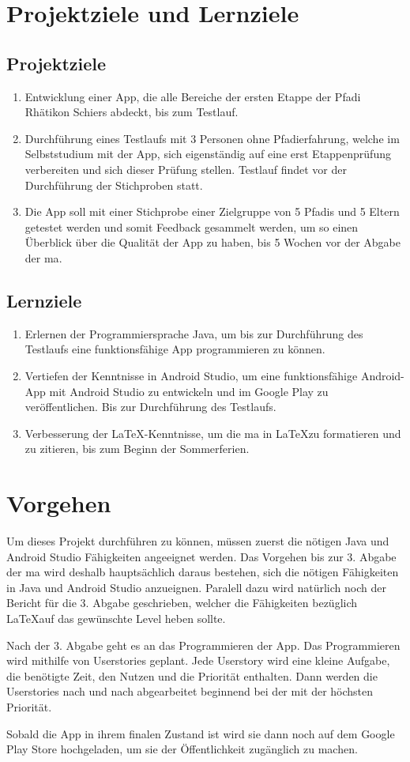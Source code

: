 \section{Projektziele und Lernziele}
\subsection*{Projektziele}
\begin{enumerate}
    \item Entwicklung einer App, die alle Bereiche der ersten Etappe der Pfadi Rhätikon Schiers abdeckt, bis zum Testlauf.
    \item Durchführung eines Testlaufs mit 3 Personen ohne Pfadierfahrung, welche im Selbststudium mit der App, sich eigenständig auf eine erst Etappenprüfung verbereiten und sich dieser Prüfung stellen. Testlauf findet vor der Durchführung der Stichproben statt.
    \item Die App soll mit einer Stichprobe einer Zielgruppe von 5 Pfadis und 5 Eltern getestet werden und somit Feedback gesammelt werden, um so einen Überblick über die Qualität der App zu haben, bis 5 Wochen vor der Abgabe der \gls{ma}.
\end{enumerate}
\subsection*{Lernziele}
\begin{enumerate}
    \item Erlernen der Programmiersprache Java, um bis zur Durchführung des Testlaufs eine funktionsfähige App programmieren zu können.
    \item Vertiefen der Kenntnisse in Android Studio, um eine funktionsfähige Android-App mit Android Studio zu entwickeln und im Google Play zu veröffentlichen. Bis zur Durchführung des Testlaufs.
    \item Verbesserung der LaTeX-Kenntnisse, um die \gls{ma} in \LaTeX zu formatieren und zu zitieren, bis zum Beginn der Sommerferien.
\end{enumerate}

\section{Vorgehen}
Um dieses Projekt durchführen zu können, müssen zuerst die nötigen Java und Android Studio Fähigkeiten angeeignet werden. Das Vorgehen bis zur 3. Abgabe der \gls{ma} wird deshalb hauptsächlich daraus bestehen, sich die nötigen Fähigkeiten in Java und Android Studio anzueignen. Paralell dazu wird natürlich noch der Bericht für die 3. Abgabe geschrieben, welcher die Fähigkeiten bezüglich \LaTeX auf das gewünschte Level heben sollte. \par
Nach der 3. Abgabe geht es an das Programmieren der App. Das Programmieren wird mithilfe von Userstories geplant. Jede Userstory wird eine kleine Aufgabe, die benötigte Zeit, den Nutzen und die Priorität enthalten. Dann werden die Userstories nach und nach abgearbeitet beginnend bei der mit der höchsten Priorität. \par
Sobald die App in ihrem finalen Zustand ist wird sie dann noch auf dem Google Play Store hochgeladen, um sie der Öffentlichkeit zugänglich zu machen.
